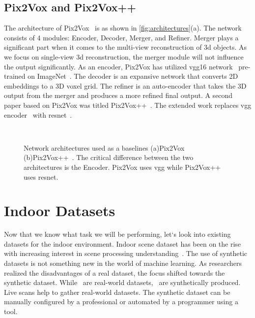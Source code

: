 \subsection{Pix2Vox and Pix2Vox++}\label{subsec:pix2vox-and-pix2vox++}
The architecture of Pix2Vox~\cite{Xie_2019} is as shown in \autoref{fig:architectures}(a).
The network consists of 4 modules: Encoder, Decoder, Merger, and Refiner.
Merger plays a significant part when it comes to the multi-view reconstruction of 3d objects.
As we focus on single-view 3d reconstruction, the merger module will not influence the output significantly.
As an encoder, Pix2Vox has utilized \gls{vgg}16 network~\cite{simonyan2015deep} pre-trained on ImageNet~\cite{Deng2009ImageNetAL}.
The decoder is an expansive network that converts 2D embeddings to a 3D voxel grid.
The refiner is an auto-encoder that takes the 3D output from the merger and produces a more refined final output.
A second paper based on Pix2Vox was titled Pix2Vox++~\cite{Xie_2020}.
The extended work replaces \gls{vgg} encoder~\cite{simonyan2015deep} with \gls{resnet}~\cite{He2016DeepRL}.

\begin{figure}[!ht]
    \centering
    \quad
    \\
    \caption[Network Architecture for Baselines.]{Network architectures used as a baselines (a)Pix2Vox~\cite{Xie_2019} (b)Pix2Vox++~\cite{Xie_2020}.
    The critical difference between the two architectures is the Encoder. Pix2Vox uses \gls{vgg} while Pix2Vox++ uses \gls{resnet}.}
    \label{fig:architectures}
\end{figure}

\section{Indoor Datasets}\label{sec:indoor-dataset}

Now that we know what task we will be performing, let`s look into existing datasets for the indoor environment.
Indoor scene dataset has been on the rise with increasing interest in scene processing understanding~\cite{Dai2017,Silberman2012,Xiao2013SUN3DAD,Hua2016SceneNNAS,Armeni20163DSP,Chang2018,Handa2016UnderstandingRI,InteriorNet18,Li_2021_CVPR,zheng2020structured3d,Roberts2020HypersimAP,McCormac2017}.
The use of synthetic datasets is not something new in the world of machine learning.
As researchers realized the disadvantages of a real dataset, the focus shifted towards the synthetic dataset.
While~\cite{Dai2017, Lim2013, Sun2018} are real-world datasets,~\cite{Fu20203DFRONT3F,Handa2016UnderstandingRI,McCormac2017,Roberts2020HypersimAP} are synthetically produced.
Live scans help to gather real-world datasets.
The synthetic dataset can be manually configured by a professional or automated by a programmer using a tool.

